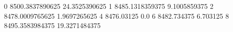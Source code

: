 0 8500.3837890625 24.3525390625
1 8485.1318359375 9.1005859375
2 8478.0009765625 1.9697265625
4 8476.03125 0.0
6 8482.734375 6.703125
8 8495.3583984375 19.3271484375
